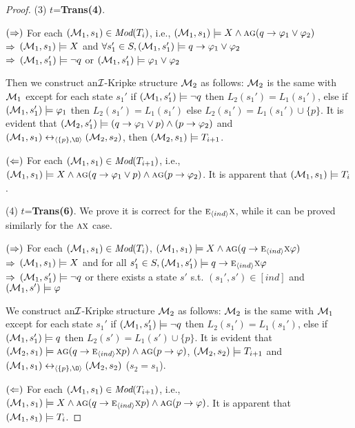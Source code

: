 \documentclass[twoside,11pt]{article}
\begin{document}
\begin{proof}
		(3) $t$=\textbf{Trans(4)}.
		
		$(\Rightarrow)$ For each $({\cal M}_1,s_1) \in \textit{Mod}(T_i)$, i.e., $({\cal M}_1,s_1) \models X \wedge \textsc{a}\textsc{g} (q \rightarrow \varphi_1 \vee \varphi_2)$ \\
		$\Rightarrow$ $({\cal M}_1,s_1) \models X$ and $\forall s_1'\in S, ({\cal M}_1,s_1') \models q \rightarrow \varphi_1 \vee \varphi_2$\\
		$\Rightarrow$ $({\cal M}_1,s_1') \models \neg q$ or $({\cal M}_1,s_1') \models \varphi_1 \vee \varphi_2$
		
		Then we construct an${\cal I}$-Kripke structure ${\cal M}_2$ as follows: ${\cal M}_2$ is the same with ${\cal M}_1$ except for each state $s_1'$ if $({\cal M}_1,s_1') \models \neg q$ then $L_2(s_1')= L_1(s_1')$, else if $({\cal M}_1,s_1') \models \varphi_1$ then $L_2(s_1')= L_1(s_1')$ else $L_2(s_1') = L_1(s_1') \cup \{p\}$. It is evident that $({\cal M}_2,s_1') \models (q\rightarrow \varphi_1 \vee p) \wedge (p \rightarrow \varphi_2)$ and $(\Hm_1, s_1) \lrto_{\tuple{\{p\}, {\O}}} (\Hm_2, s_2)$, then $({\cal M}_2,s_1) \models T_{i+1}$.
		
		$(\Leftarrow)$ For each $({\cal M}_1, s_1) \in \textit{Mod}(T_{i+1})$, i.e., $({\cal M}_1,s_1) \models X \wedge \textsc{a}\textsc{g} (q\rightarrow \varphi_1 \vee p) \wedge \textsc{a}\textsc{g}(p \rightarrow \varphi_2)$. It is apparent that $({\cal M}_1, s_1) \models T_i$.
		
		
		(4) $t$=\textbf{Trans(6)}.
		We prove it is correct for the $\textsc{e}_{{\langle{ind}\rangle}} \textsc{x}$, while it can be proved similarly for the $\textsc{a} \textsc{x}$ case.
		
		$(\Rightarrow)$ For each $({\cal M}_1,s_1) \in \textit{Mod}(T_i)$, \ie $({\cal M}_1,s_1) \models X \wedge \textsc{a}\textsc{g}(q \rightarrow \textsc{e}_{{\langle{ind}\rangle}}\textsc{x} \varphi)$\\
		$\Rightarrow$ $({\cal M}_1,s_1) \models X$ and for all $s_1'\in S, ({\cal M}_1,s_1') \models q \rightarrow \textsc{e}_{{\langle{ind}\rangle}} \textsc{x} \varphi$\\
		$\Rightarrow$ $({\cal M}_1,s_1') \models \neg q$ or there exists a state $s'$ s.t. $(s_1', s') \in [ind]$ and $({\cal M}_1,s') \models \varphi$
		
		We construct an${\cal I}$-Kripke structure ${\cal M}_2$ as follows: ${\cal M}_2$ is the same with ${\cal M}_1$ except for each state $s_1'$ if $({\cal M}_1,s_1') \models \neg q$ then $L_2(s_1')= L_1(s_1')$, else if $({\cal M}_1,s_1') \models q$ then $L_2(s') = L_1(s') \cup \{p\}$. It is evident that $({\cal M}_2,s_1) \models \textsc{a}\textsc{g}(q\rightarrow \textsc{e}_{{\langle{ind}\rangle}} \textsc{x} p) \wedge \textsc{a}\textsc{g}(p \rightarrow \varphi)$, $({\cal M}_2,s_2) \models T_{i+1}$ and $(\Hm_1, s_1) \lrto_{\tuple{\{p\}, {\O}}} (\Hm_2, s_2)$ ($s_2=s_1$).
		
		$(\Leftarrow)$ For each $({\cal M}_1, s_1) \in \textit{Mod}(T_{i+1})$, i.e., $({\cal M}_1,s_1) \models X \wedge \textsc{a}\textsc{g}(q\rightarrow \textsc{e}_{{\langle{ind}\rangle}} \textsc{x} p) \wedge \textsc{a}\textsc{g}(p \rightarrow \varphi)$. It is apparent that $({\cal M}_1, s_1) \models T_i$.
		
	\end{proof}
	
\end{document}
